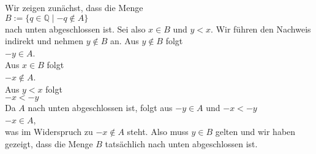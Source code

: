 \proof
Wir zeigen zunächst, dass die Menge
\\[0.2cm]
\hspace*{1.3cm}
 $B := \{ q \in \mathbb{Q} \mid -q \not\in A \}$ 
\\[0.2cm]
nach unten abgeschlossen ist.  Sei also $x \in B$ und $y < x$.  Wir führen den Nachweis indirekt und
nehmen $y \not\in B$ an.  Aus $y \not\in B$ folgt
\\[0.2cm]
\hspace*{1.3cm}
$-y \in A$.
\\[0.2cm]
Aus $x \in B$ folgt
\\[0.2cm]
\hspace*{1.3cm}
$-x \not\in A$.
\\[0.2cm]
Aus $y < x$ folgt 
\\[0.2cm]
\hspace*{1.3cm}
$-x < -y$
\\[0.2cm]
Da $A$ nach unten abgeschlossen ist, folgt aus $-y \in A$ und $-x < -y$ 
\\[0.2cm]
\hspace*{1.3cm}
$-x \in A$, 
\\[0.2cm]
was im Widerspruch zu $-x \not\in A$ steht.  Also muss $y \in B$ gelten und wir haben gezeigt, dass die Menge $B$
tatsächlich nach unten abgeschlossen ist.
